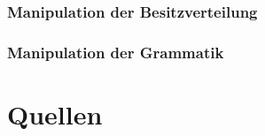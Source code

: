 \documentclass[]{article}
\begin{document}
\subsubsection*{Manipulation der Besitzverteilung}
\subsubsection*{Manipulation der Grammatik}






\newpage
\section{Quellen}





\end{document}

